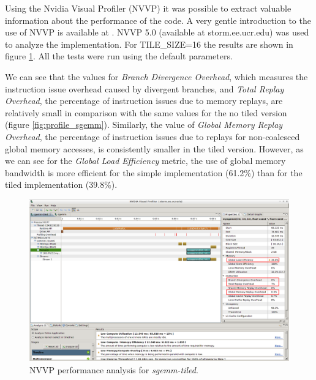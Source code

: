 \documentclass[a4paper,10pt]{scrartcl}
\begin{document}
\begin{enumerate}
Using the Nvidia Visual Profiler (NVVP) it was possible to extract valuable information about the performance of the code. A very gentle introduction to the use of NVVP is available at \cite{nvvp_tutorial}.  NVVP 5.0 (available at storm.ee.ucr.edu) was used to analyze the implementation.  For TILE\_SIZE=16 the results are shown in figure \ref{fig:profile_sgemm-tiled}. All the tests were run using the default parameters.  

We can see that the values for \textit{Branch Divergence Overhead}, which measures the instruction issue overhead caused by divergent branches, and \textit{Total Replay Overhead}, the percentage of instruction issues due to memory replays, are relatively small in comparison with the same values for the no tiled version (figure \ref{fig:profile_sgemm}).  Similarly, the value of \textit{Global Memory Replay Overhead}, the percentage of instruction issues due to replays for non-coalesced global memory accesses, is consistently smaller in the tiled version. However, as we can see for the \textit{Global Load Efficiency } metric, the use of global memory bandwidth is more efficient for the simple implementation (61.2\%) than for the tiled implementation (39.8\%).

 \begin{figure}
 \centering
 \includegraphics[width=\textwidth]{./profile_sgemm-tiled.png}
 \caption{NVVP performance analysis for \textit{sgemm-tiled}.}\label{fig:profile_sgemm-tiled}
 \end{figure}


\end{enumerate}
\end{document}
